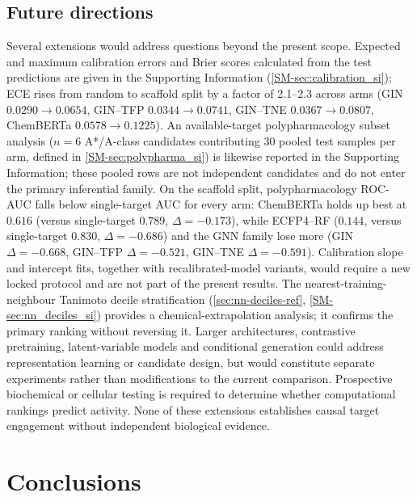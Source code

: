 \documentclass[11pt,a4paper]{article}
\begin{document}
\subsection{Future directions}

Several extensions would address questions beyond the present scope. Expected and maximum calibration errors and Brier scores calculated from the test predictions are given in the Supporting Information (\cref{SM-sec:calibration_si}); ECE rises from random to scaffold split by a factor of \numrange{2.1}{2.3} across arms (GIN $\num{0.0290} \to \num{0.0654}$, GIN--TFP $\num{0.0344} \to \num{0.0741}$, GIN--TNE $\num{0.0367} \to \num{0.0807}$, ChemBERTa $\num{0.0578} \to \num{0.1225}$). An available-target polypharmacology subset analysis ($n=6$ A*/A-class candidates contributing $\num{30}$ pooled test samples per arm, defined in \cref{SM-sec:polypharma_si}) is likewise reported in the Supporting Information; these pooled rows are not independent candidates and do not enter the primary inferential family. On the scaffold split, polypharmacology ROC-AUC falls below single-target AUC for every arm: ChemBERTa holds up best at $\num{0.616}$ (versus single-target $\num{0.789}$, $\Delta = -\num{0.173}$), while ECFP4--RF ($\num{0.144}$, versus single-target $\num{0.830}$, $\Delta = -\num{0.686}$) and the GNN family lose more (GIN $\Delta = -\num{0.668}$, GIN--TFP $\Delta = -\num{0.521}$, GIN--TNE $\Delta = -\num{0.591}$). Calibration slope and intercept fits, together with recalibrated-model variants, would require a new locked protocol and are not part of the present results. The nearest-training-neighbour Tanimoto decile stratification (\cref{sec:nn-deciles-ref}, \cref{SM-sec:nn_deciles_si}) provides a chemical-extrapolation analysis; it confirms the primary ranking without reversing it. Larger architectures, contrastive pretraining, latent-variable models and conditional generation could address representation learning or candidate design, but would constitute separate experiments rather than modifications to the current comparison. Prospective biochemical or cellular testing is required to determine whether computational rankings predict activity. None of these extensions establishes causal target engagement without independent biological evidence.

\section{Conclusions}
\end{document}
